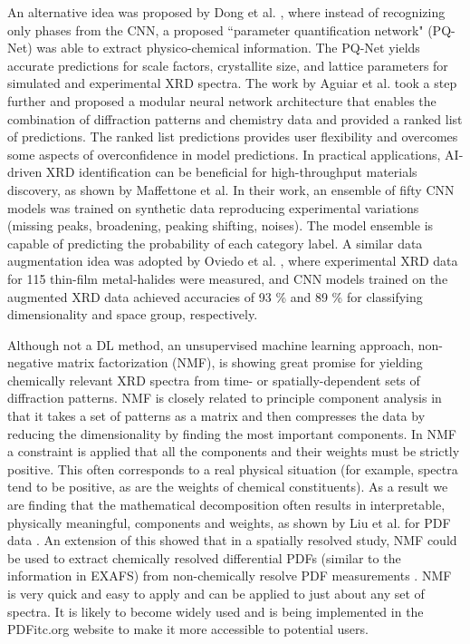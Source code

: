 \documentclass[pdflatex,sn-mathphys]{sn-jnl}%
\theoremstyle{thmstyleone}%
\theoremstyle{thmstyletwo}%
\theoremstyle{thmstylethree}%
\begin{document}
An alternative idea was proposed by Dong et al. \cite{dongDeepConvolutionalNeural2021}, where instead of recognizing only phases from the CNN, a proposed ``parameter quantification network" (PQ-Net) was able to extract physico-chemical information. The PQ-Net yields accurate predictions for scale factors, crystallite size, and lattice parameters for simulated and experimental XRD spectra. The work by Aguiar et al. \cite{aguiarCrystallographicPredictionDiffraction2020} took a step further and proposed a modular neural network architecture that enables the combination of diffraction patterns and chemistry data and provided a ranked list of predictions. The ranked list predictions provides user flexibility and overcomes some aspects of overconfidence in model predictions. 
In practical applications, AI-driven XRD identification can be beneficial for high-throughput materials discovery, as shown by Maffettone et al. \cite{maffettoneCrystallographyCompanionAgent2021a} In their work, an ensemble of fifty CNN models was trained on synthetic data reproducing experimental variations (missing peaks, broadening, peaking shifting, noises). The model ensemble is capable of predicting the probability of each category label. A similar data augmentation idea was adopted by Oviedo et al. \cite{oviedoFastInterpretableClassification2019}, where experimental XRD data for 115 thin-film metal-halides were measured, and CNN models trained on the augmented XRD data achieved accuracies of 93 \% and 89 \% for classifying dimensionality and space group, respectively. 

Although not a DL method, an unsupervised machine learning approach, non-negative matrix factorization (NMF), is showing great promise for yielding chemically relevant XRD spectra from time- or spatially-dependent sets of diffraction patterns.  NMF is closely related to principle component analysis in that it takes a set of patterns as a matrix and then compresses the data by reducing the dimensionality by finding the most important components.  In NMF a constraint is applied that all the components and their weights must be strictly positive.  This often corresponds to a real physical situation (for example, spectra tend to be positive, as are the weights of chemical constituents).  As a result we are finding that the mathematical decomposition often results in interpretable, physically meaningful, components and weights, as shown by Liu et al. for PDF data \cite{liu;jac21}.  An extension of this showed that in a spatially resolved study, NMF could be used to extract chemically resolved differential PDFs (similar to the information in EXAFS) from non-chemically resolve PDF measurements \cite{rakit;arxiv21}.  NMF is very quick and easy to apply and can be applied to just about any set of spectra.  It is likely to become widely used and is being implemented in the PDFitc.org website to make it more accessible to potential users.
\end{document}
